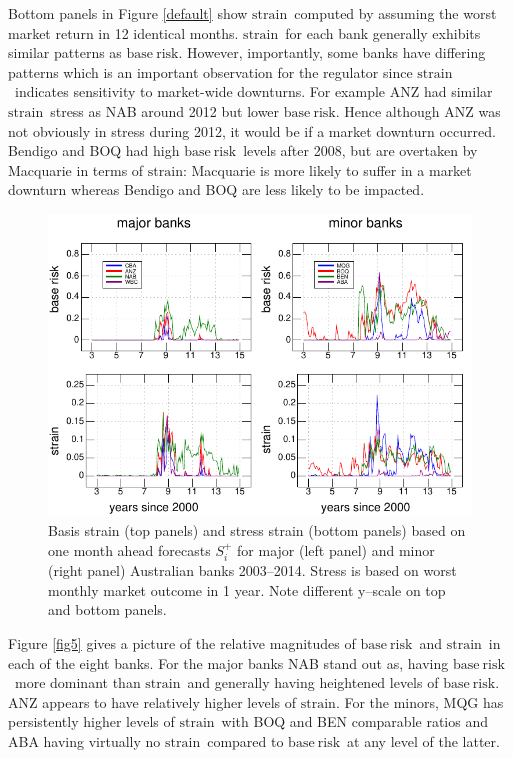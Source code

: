 \documentclass[authoryear]{elsarticle}
\newcommand{\br}{\ensuremath{\mathrm{base\ risk}}}
\newcommand{\pr}{\ensuremath{\mathrm{strain}}}
\newcommand{\fref}[1]{Figure \ref{#1}}
\begin{document}
Bottom panels in \fref{default} show \pr\ computed by assuming the worst market return in 12 identical months. \pr\ for each bank generally exhibits similar patterns as \br. However, importantly, some banks have differing patterns which is an important observation for the regulator since \pr\ indicates sensitivity to market-wide downturns. For example ANZ had similar \pr\ stress as NAB around 2012 but lower \br. Hence although ANZ was not obviously in stress during 2012, it would be if a market downturn occurred. Bendigo and BOQ had high \br\ levels after 2008, but are overtaken by Macquarie in terms of \pr: Macquarie is more likely to suffer in a market downturn whereas Bendigo and BOQ are less likely to be impacted.

\begin{figure}[htbp]
\begin{center}
\includegraphics[width=12cm]{figures/fig4.pdf}
\caption{Basis strain  (top panels) and stress strain (bottom panels) based on one month ahead  forecasts $S_i^+$ for   major (left panel) and  minor (right panel)  Australian banks 2003--2014.  Stress is based on worst monthly market outcome in 1 year.  Note different y--scale on top and bottom panels.}\label{fig4}
\end{center}
\end{figure}

\fref{fig5} gives a picture of the relative magnitudes of \br\ and \pr\ in each of the eight banks.   For the major banks NAB stand out as, having \br\ more dominant than \pr\ and generally having heightened levels of \br.   ANZ appears to have relatively higher levels of \pr.    For the minors, MQG has persistently higher levels of \pr\ with BOQ and BEN comparable ratios and ABA having virtually no \pr\ compared to \br\ at any level of the latter. 
\end{document}
